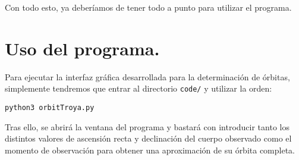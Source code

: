 Con todo esto, ya deberíamos de tener todo a punto para utilizar el programa.\\

\section{Uso del programa.}
Para ejecutar la interfaz gráfica desarrollada para la determinación de órbitas, simplemente tendremos que entrar al directorio \texttt{code/} y utilizar la orden:
\begin{lstlisting}[style=Console]
python3 orbitTroya.py
\end{lstlisting}

Tras ello, se abrirá la ventana del programa y bastará con introducir tanto los distintos valores de ascensión recta y declinación del cuerpo observado como el momento de observación para obtener una aproximación de su órbita completa.

